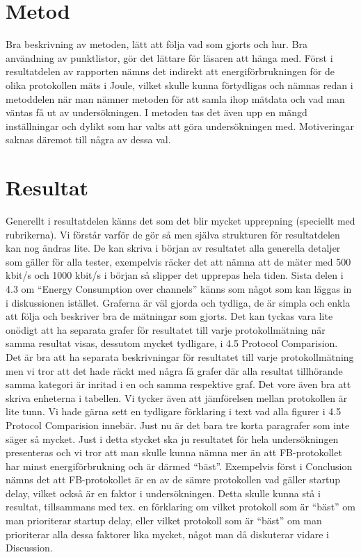 \documentclass{article}
\begin{document}
\section{Metod}
Bra beskrivning av metoden, lätt att följa vad som gjorts och hur. Bra användning av punktlistor, gör det lättare för läsaren att hänga med. Först i resultatdelen av rapporten nämns det indirekt att energiförbrukningen för de olika protokollen mäts i Joule, vilket skulle kunna förtydligas och nämnas redan i metoddelen när man nämner metoden för att samla ihop mätdata och vad man väntas få ut av undersökningen.
I metoden tas det även upp en mängd inställningar och dylikt som har valts att göra undersökningen med. Motiveringar saknas däremot till några av dessa val.


\section{Resultat}
Generellt i resultatdelen känns det som det blir mycket upprepning (speciellt med rubrikerna). Vi förstår varför de gör så men själva strukturen för resultatdelen kan nog ändras lite. De kan skriva i början av resultatet alla generella detaljer som gäller för alla tester, exempelvis räcker det att nämna att de mäter med 500 kbit/s och 1000 kbit/s i början så slipper det upprepas hela tiden. Sista delen i 4.3 om “Energy Consumption over channels” känns som något som kan läggas in i diskussionen istället.
Graferna är väl gjorda och tydliga, de är simpla och enkla att följa och beskriver bra de mätningar som gjorts. Det kan tyckas vara lite onödigt att ha separata grafer för resultatet till varje protokollmätning när samma resultat visas, dessutom mycket tydligare, i 4.5 Protocol Comparision. Det är bra att ha separata beskrivningar för resultatet till varje protokollmätning men vi tror att det hade räckt med några få grafer där alla resultat tillhörande samma kategori är inritad i en och samma respektive graf. Det vore även bra att skriva enheterna i tabellen.
Vi tycker även att jämförelsen mellan protokollen är lite tunn. Vi hade gärna sett en tydligare förklaring i text vad alla figurer i 4.5 Protocol Comparision innebär. Just nu är det bara tre korta paragrafer som inte säger så mycket. Just i detta stycket ska ju resultatet för hela undersökningen presenteras och vi tror att man skulle kunna nämna mer än att FB-protokollet har minst energiförbrukning och är därmed “bäst”. Exempelvis först i Conclusion nämns det att FB-protokollet är en av de sämre protokollen vad gäller startup delay, vilket också är en faktor i undersökningen. Detta skulle kunna stå i resultat, tillsammans med tex. en förklaring om vilket protokoll som är “bäst” om man prioriterar startup delay, eller vilket protokoll som är “bäst” om man prioriterar alla dessa faktorer lika mycket, något man då diskuterar vidare i Discussion.
\end{document}
